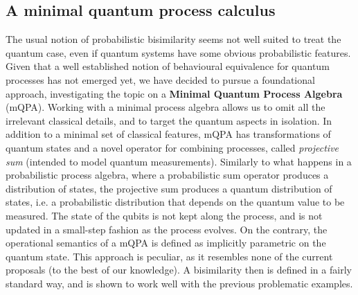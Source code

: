  
\subsection*{A minimal quantum process calculus}
 
The usual notion of probabilistic bisimilarity seems not well suited to treat the quantum case, even if quantum systems have some obvious probabilistic features. Given that a well established notion of behavioural equivalence for quantum processes has not emerged yet, we have decided to pursue a foundational approach, investigating the topic on a \textbf{Minimal Quantum Process Algebra} (mQPA).
Working with a minimal process algebra allows us to omit all the irrelevant classical details, and to target the quantum aspects in isolation.
In addition to a minimal set of classical features, mQPA has transformations of quantum states and a novel operator for combining processes, called \textit{projective sum} (intended to model quantum measurements).
Similarly to what happens in a probabilistic process algebra, where a probabilistic sum operator produces a distribution
of states, the projective sum produces a quantum distribution of states, i.e. a probabilistic distribution that depends on the quantum value
to be measured.
The state of the qubits is not kept along the process, and is not updated in a small-step fashion as the process evolves.
On the contrary, the operational semantics of a mQPA is defined as implicitly parametric on the quantum state.
This approach is peculiar, as it resembles none of the current proposals (to the best of our knowledge).
A bisimilarity then is defined in a fairly standard way, and is shown to work well with the previous problematic examples.
 
